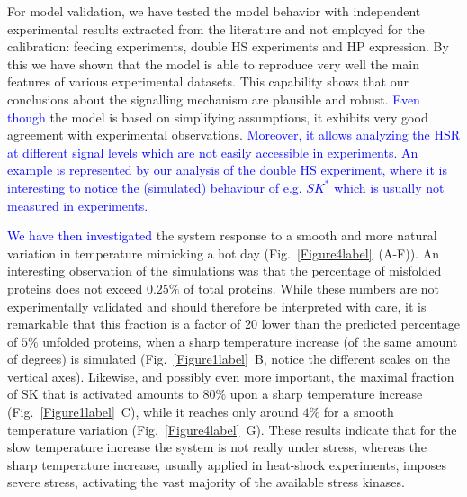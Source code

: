 \documentclass[oneside, 10pt, a4paper, twocolumn]{article}
\begin{document}
For model validation,  we have tested the model behavior with independent experimental results extracted from the literature and not employed for the calibration: 
feeding experiments, %
double HS experiments and %
HP expression. %
By this we have shown that the model is able to reproduce very well the main features of various experimental datasets. This capability shows that our conclusions about the signalling mechanism are plausible and robust.
\textcolor{blue}{Even though} the model is based on simplifying assumptions, it exhibits very good agreement with experimental observations. \textcolor{blue}{Moreover, it allows analyzing the HSR at different signal levels which are not easily accessible in experiments. An example is represented by our analysis of the double HS experiment, where it is interesting to notice the (simulated) behaviour of e.g. $SK^*$ which is usually not measured in experiments.} 

\textcolor{blue}{We have then investigated} the system response to a smooth and more natural variation in temperature mimicking a hot day (Fig.~\ref{Figure4label}~(A-F)).
An interesting observation of the simulations was that the percentage of misfolded proteins does not exceed $0.25 \%$ of total proteins.
While these numbers are not experimentally validated and should therefore be interpreted with care, it is remarkable that this fraction
is a factor of 20 lower than the predicted percentage of $5\%$ unfolded proteins, when a sharp temperature increase (of the same amount of degrees) is simulated
(Fig.~\ref{Figure1label}~B, notice the different scales on the vertical axes).
Likewise, and possibly even more important, the maximal fraction of SK that is activated amounts to $80\%$ upon a sharp temperature increase (Fig.~\ref{Figure1label}~C),
while it reaches only around $4\%$ for a smooth temperature variation (Fig.~\ref{Figure4label}~G).
These results indicate that for the slow temperature increase the system is not really under stress, whereas the sharp temperature increase,
usually applied in heat-shock experiments, imposes severe stress, activating the vast majority of the available stress kinases.
\end{document}
